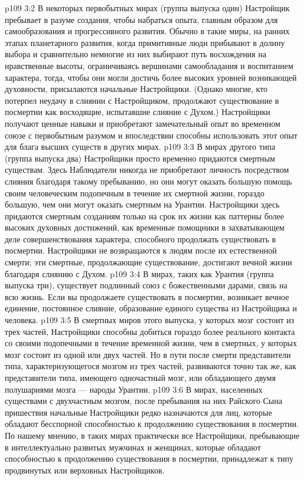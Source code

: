 \vs p109 3:2 В некоторых первобытных мирах (группа выпуска один) Настройщик пребывает в разуме создания, чтобы набраться опыта, главным образом для самообразования и прогрессивного развития. Обычно в такие миры, на ранних этапах планетарного развития, когда примитивные люди прибывают в долину выбора и сравнительно немногие из них выбирают путь восхождения на нравственные высоты, ограничиваясь вершинами самообладания и воспитанием характера, тогда, чтобы они могли достичь более высоких уровней возникающей духовности, присылаются начальные Настройщики. (Однако многие, кто потерпел неудачу в слиянии с Настройщиком, продолжают существование в посмертии как восходящие, испытавшие слияние с Духом.) Настройщики получают ценные навыки и приобретают замечательный опыт во временном союзе с первобытным разумом и впоследствии способны использовать этот опыт для блага высших существ в других мирах. 
\vs p109 3:3 В мирах другого типа (группа выпуска два) Настройщики просто временно придаются смертным существам. Здесь Наблюдатели никогда не приобретают личность посредством слияния благодаря такому пребыванию, но они могут оказать большую помощь своим человеческим подопечным в течение их смертной жизни, гораздо большую, чем они могут оказать смертным на Урантии. Настройщики здесь придаются смертным созданиям только на срок их жизни как паттерны более высоких духовных достижений, как временные помощники в захватывающем деле совершенствования характера, способного продолжать существовать в посмертии. Настройщики не возвращаются к людям после их естественной смерти; эти смертные, продолжающие существование, достигают вечной жизни благодаря слиянию с Духом.
\vs p109 3:4 В мирах, таких как Урантия (группа выпуска три), существует подлинный союз с божественными дарами, связь на всю жизнь. Если вы продолжаете существовать в посмертии, возникает вечное единение, постоянное слияние, образование единого существа из Настройщика и человека.
\vs p109 3:5 В смертных миров этого выпуска, у которых мозг состоит из трех частей, Настройщики способны добиться гораздо более реального контакта со своими подопечными в течение временной жизни, чем в смертных, у которых мозг состоит из одной или двух частей. Но в пути после смерти представители типа, характеризующегося мозгом из трех частей, развиваются точно так же, как представители типа, имеющего одночастный мозг, или обладающего двумя полушариями мозга --- народы Урантии.
\vs p109 3:6 В мирах, населенных существами с двухчастным мозгом, после пребывания на них Райского Сына пришествия начальные Настройщики редко назначаются для лиц, которые обладают бесспорной способностью к продолжению существования в посмертии. По нашему мнению, в таких мирах практически все Настройщики, пребывающие в интеллектуально развитых мужчинах и женщинах, которые обладают способностью к продолжению существования в посмертии, принадлежат к типу продвинутых или верховных Настройщиков.
